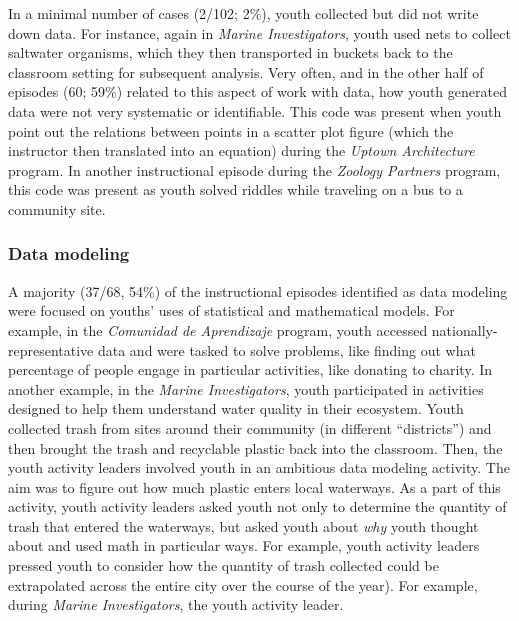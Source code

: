 \documentclass[]{book}
\theoremstyle{definition}
\theoremstyle{definition}
\theoremstyle{definition}
\theoremstyle{remark}
\begin{document}
In a minimal number of cases (2/102; 2\%), youth collected but did not
write down data. For instance, again in \emph{Marine Investigators},
youth used nets to collect saltwater organisms, which they then
transported in buckets back to the classroom setting for subsequent
analysis. Very often, and in the other half of episodes (60; 59\%)
related to this aspect of work with data, how youth generated data were
not very systematic or identifiable. This code was present when youth
point out the relations between points in a scatter plot figure (which
the instructor then translated into an equation) during the \emph{Uptown
Architecture} program. In another instructional episode during the
\emph{Zoology Partners} program, this code was present as youth solved
riddles while traveling on a bus to a community site.

\subsubsection{Data modeling}\label{data-modeling}

A majority (37/68, 54\%) of the instructional episodes identified as
data modeling were focused on youths' uses of statistical and
mathematical models. For example, in the \emph{Comunidad de Aprendizaje}
program, youth accessed nationally-representative data and were tasked
to solve problems, like finding out what percentage of people engage in
particular activities, like donating to charity. In another example, in
the \emph{Marine Investigators}, youth participated in activities
designed to help them understand water quality in their ecosystem. Youth
collected trash from sites around their community (in different
``districts'') and then brought the trash and recyclable plastic back
into the classroom. Then, the youth activity leaders involved youth in
an ambitious data modeling activity. The aim was to figure out how much
plastic enters local waterways. As a part of this activity, youth
activity leaders asked youth not only to determine the quantity of trash
that entered the waterways, but asked youth about \emph{why} youth
thought about and used math in particular ways. For example, youth
activity leaders pressed youth to consider how the quantity of trash
collected could be extrapolated across the entire city over the course
of the year). For example, during \emph{Marine Investigators}, the youth
activity leader.
\end{document}
